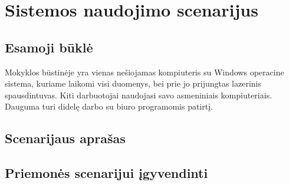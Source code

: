 \chapter{Sistemos naudojimo scenarijus}

\section{Esamoji būklė}

Mokyklos būstinėje yra vienas nešiojamas kompiuteris su Windows operacine
sistema, kuriame laikomi visi duomenys, bei prie jo prijungtas lazerinis
spausdintuvas. Kiti darbuotojai naudojasi savo asmeniniais kompiuteriais.
Dauguma turi didelę darbo su biuro programomis patirtį.

\section{Scenarijaus aprašas}

\section{Priemonės scenarijui įgyvendinti}
